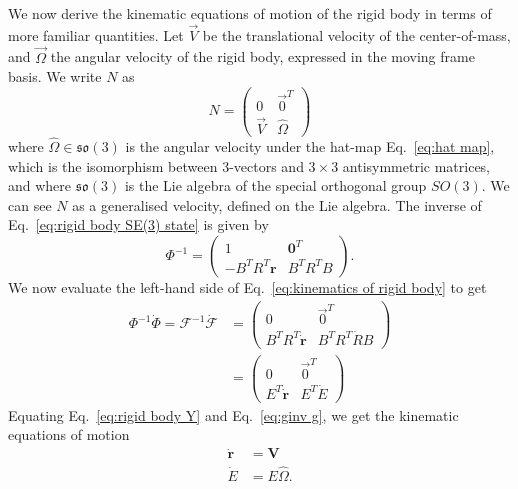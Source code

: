 We now derive the kinematic equations of motion of the rigid body in terms of more familiar quantities. Let $\vec{V}$ be the translational velocity of the center-of-mass, and $\vec{\Omega}$ the angular velocity of the rigid body, expressed in the moving frame basis. We write $N$ as
\begin{equation} \label{eq:rigid body Y}
N = \begin{pmatrix}
0 & \vec{0}^T \\
\vec{V} & \hat{\Omega}
\end{pmatrix}
\end{equation}
where $\hat{\Omega} \in \mathfrak{so}(3)$ is the angular velocity under the hat-map Eq.~\ref{eq:hat map}, which is the isomorphism between $3$-vectors and $3 \times 3$ antisymmetric matrices, and where $\mathfrak{so}(3)$ is the Lie algebra of the special orthogonal group $SO(3)$. We can see $N$ as a generalised velocity, defined on the Lie algebra. The inverse of Eq.~\ref{eq:rigid body SE(3) state} is given by
\begin{equation}
\Phi^{-1} = \begin{pmatrix}
1 & \mathbf{0}^T \\
-B^T R^T \mathbf{r} & B^T R^T B
\end{pmatrix}.
\end{equation}
We now evaluate the left-hand side of Eq.~\ref{eq:kinematics of rigid body} to get
\begin{equation} \label{eq:ginv g}
\begin{aligned}
\Phi^{-1} \dot{\Phi} = \mathcal{F}^{-1} \dot{\mathcal{F}} & = \begin{pmatrix}
  0 & \vec{0}^T \\
  B^T R^T \dot{\mathbf{r}} & B^T R^T \dot{R} B
\end{pmatrix} \\
& = \begin{pmatrix}
  0 & \vec{0}^T \\
  E^T \dot{\mathbf{r}} &  E^T \dot{E} 
\end{pmatrix}
\end{aligned}
\end{equation}
Equating Eq.~\ref{eq:rigid body Y} and Eq.~\ref{eq:ginv g}, we get the kinematic equations of motion
\begin{subequations}
\begin{align}
\dot{\mathbf{r}} & = \mathbf{V} \\
\dot{E} & = E \hat{\Omega}. \label{eq:frame eom}
\end{align}
\end{subequations}
